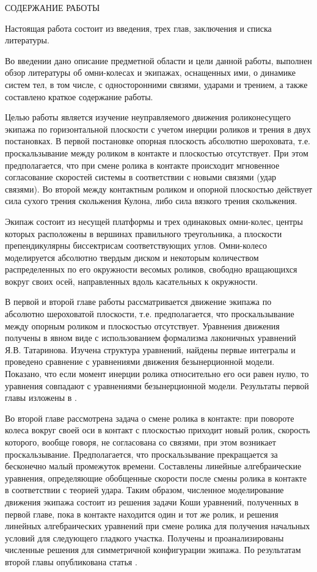 СОДЕРЖАНИЕ РАБОТЫ

Настоящая работа состоит из введения, трех глав, заключения и списка литературы.

Во введении дано описание предметной области и цели данной работы, выполнен обзор литературы об омни-колесах и экипажах, оснащенных ими, о динамике систем тел, в том числе, с односторонними связями, ударами и трением, а также составлено краткое содержание работы.

Целью работы является изучение неуправляемого движения роликонесущего экипажа по горизонтальной плоскости с учетом инерции роликов и трения в двух постановках. В первой постановке опорная плоскость абсолютно шероховата, т.е. проскальзывание между роликом в контакте и плоскостью отсутствует. При этом предполагается, что при смене ролика в контакте происходит мгновенное согласование скоростей системы в соответствии с новыми связями (удар связями). Во второй между контактным роликом и опорной плоскостью действует сила сухого трения скольжения Кулона, либо сила вязкого трения скольжения. 

Экипаж состоит из несущей платформы и трех одинаковых омни-колес, центры которых расположены в вершинах правильного треугольника, а плоскости препендикулярны биссектрисам соответствующих углов. Омни-колесо моделируется абсолютно твердым диском и некоторым количеством распределенных по его окружности весомых роликов, свободно вращающихся вокруг своих осей, направленных вдоль касательных к окружности.

В первой и второй главе работы рассматривается движение  экипажа по абсолютно  шероховатой плоскости, т.е. предполагается, что проскальзывание между опорным роликом и плоскостью отсутствует. Уравнения движения получены в явном виде с использованием формализма лаконичных уравнений Я.В. Татаринова. Изучена структура уравнений, найдены первые интегралы и проведено сравнение с уравнениями движения безынерционной модели. Показано, что если момент инерции ролика относительно его оси равен нулю, то уравнения совпадают с уравнениями безынерционной модели. Результаты первой главы изложены в \cite{GerasimovZobovaPMM2018}.

Во второй главе рассмотрена задача о смене ролика в контакте: при повороте колеса вокруг своей оси в контакт с плоскостью приходит новый ролик, скорость которого, вообще говоря, не согласована со связями, при этом возникает проскальзывание. Предполагается, что проскальзывание прекращается за бесконечно малый промежуток времени. Составлены линейные алгебраические уравнения, определяющие обобщенные скорости после смены ролика в контакте в соответствии с теорией удара. Таким образом, численное моделирование движения экипажа состоит из решения задачи Коши уравнений, полученных в первой главе, пока в контакте находится один и тот же ролик, и решения линейных алгебраических уравнений при смене ролика для получения начальных условий для следующего гладкого участка. Получены и проанализированы численные решения для симметричной конфигурации экипажа. По результатам второй главы опубликована статья  \cite{GerasimovZobovaTrudyMAI2018}.

